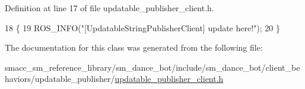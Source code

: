 Definition at line 17 of file updatable\+\_\+publisher\+\_\+client.\+h.


\begin{DoxyCode}
18     \{
19         ROS\_INFO(\textcolor{stringliteral}{"[UpdatableStringPublisherClient] update here!"});
20     \}
\end{DoxyCode}


The documentation for this class was generated from the following file\+:\begin{DoxyCompactItemize}
\item 
smacc\+\_\+sm\+\_\+reference\+\_\+library/sm\+\_\+dance\+\_\+bot/include/sm\+\_\+dance\+\_\+bot/client\+\_\+behaviors/updatable\+\_\+publisher/\hyperlink{updatable__publisher__client_8h}{updatable\+\_\+publisher\+\_\+client.\+h}\end{DoxyCompactItemize}
